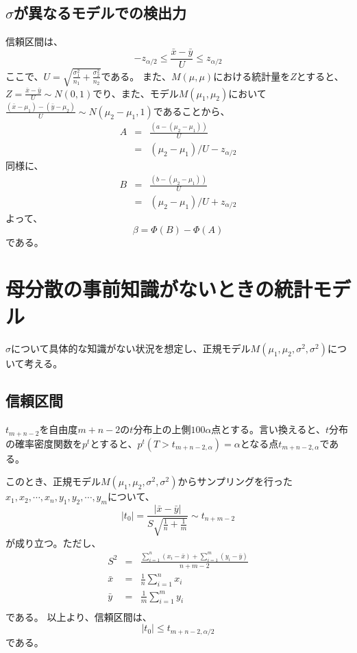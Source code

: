 \subsection{$\sigma$が異なるモデルでの検出力}
信頼区間は、
\begin{equation*}
    -z_{\alpha/2} \leq \frac{\bar{x}-\bar{y}}{U} \leq z_{\alpha/2}
\end{equation*}
ここで、$U=\sqrt{\frac{\sigma^2_1}{n_1}+\frac{\sigma^2_2}{n_2}}$である。
また、$M(\mu,\mu)$における統計量を$Z$とすると、$Z = \frac{\bar{x}-\bar{y}}{U}\sim N(0,1)$でり、また、モデル$M(\mu_1,\mu_2)$において$\frac{(\bar{x}-\mu_1)-(\bar{y}-\mu_2)}{U} \sim N(\mu_2-\mu_1,1)$であることから、
\begin{eqnarray*}
    A &=& \frac{(a-(\mu_2-\mu_1))}{U} \\
        &=& (\mu_2-\mu_1)/U-z_{\alpha/2}
\end{eqnarray*}
同様に、
\begin{eqnarray*}
    B &=& \frac{(b-(\mu_2-\mu_1))}{U} \\
        &=& (\mu_2-\mu_1)/U+z_{\alpha/2}
\end{eqnarray*}
よって、
\begin{equation*}
    \beta = \varPhi(B)-\varPhi(A)
\end{equation*}
である。



\section{母分散の事前知識がないときの統計モデル}
$\sigma$について具体的な知識がない状況を想定し、正規モデル$M(\mu_1,\mu_2,\sigma^2,\sigma^2)$について考える。


\subsection{信頼区間}
$t_{m+n-2}$を自由度$m+n-2$の$t$分布上の上側$100\alpha$点とする。言い換えると、$t$分布の確率密度関数を$p^t$とすると、$p^t(T > t_{m+n-2,\alpha}) = \alpha$となる点$t_{m+n-2,\alpha}$である。

このとき、正規モデル$M(\mu_1,\mu_2,\sigma^2,\sigma^2)$からサンプリングを行った$x_1,x_2,\cdots,x_n,y_1,y_2,\cdots,y_m$について、
\begin{equation*}
    |t_0| = \frac{|\bar{x}-\bar{y}|}{S\sqrt{\frac{1}{n}+\frac{1}{m}}}\sim t_{n+m-2}
\end{equation*}
が成り立つ。ただし、
\begin{eqnarray*}
    S^2 &=& \frac{\sum_{i=1}^n(x_i-\bar{x})+\sum_{i=1}^m (y_i-\bar{y})}{n+m-2} \\
    \bar{x} &=& \frac{1}{n}\sum_{i=1}^n x_i\\
    \bar{y} &=& \frac{1}{m}\sum_{i=1}^m y_i\\
\end{eqnarray*}
である。
以上より、信頼区間は、
\begin{equation*}
    |t_0| \leq t_{m+n-2,\alpha/2}
\end{equation*}
である。

